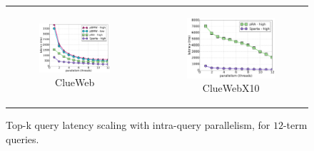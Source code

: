 \begin{figure}[tbh]
\centering
\begin{tabular}{ccc}
      \begin{subfigure}[t]{0.3\textwidth}
         \includegraphics[width=\textwidth]{figures/latency_12terms_clueweb.pdf}
        \caption[]{ClueWeb}
      \end{subfigure} 
& 
	\hspace{0.1\textwidth}
& 
      \begin{subfigure}[t]{0.3\textwidth}
      \includegraphics[width=\textwidth]{figures/latency_12terms_cluewebX10.pdf}
	  \caption{ClueWebX10}
      \end{subfigure}
\end{tabular}
\caption{Top-k query latency scaling with intra-query parallelism, for $12$-term queries.}
\label{fig:threads-scaling}
\end{figure}


